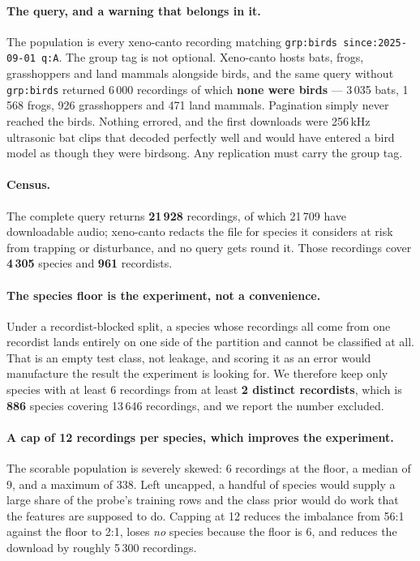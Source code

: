 \documentclass[10pt,twocolumn,a4paper]{article}
\begin{document}
\paragraph{The query, and a warning that belongs in it.} The population is every xeno-canto
recording matching \texttt{grp:birds since:2025-09-01 q:A}. The group tag is not optional.
Xeno-canto hosts bats, frogs, grasshoppers and land mammals alongside birds, and the same
query without \texttt{grp:birds} returned 6\,000 recordings of which \textbf{none were
birds} --- 3\,035 bats, 1\,568 frogs, 926 grasshoppers and 471 land mammals. Pagination
simply never reached the birds. Nothing errored, and the first downloads were 256\,kHz
ultrasonic bat clips that decoded perfectly well and would have entered a bird model as
though they were birdsong. Any replication must carry the group tag.

\paragraph{Census.} The complete query returns \textbf{21\,928} recordings, of which
21\,709 have downloadable audio; xeno-canto redacts the file for species it considers at
risk from trapping or disturbance, and no query gets round it. Those recordings cover
\textbf{4\,305} species and \textbf{961} recordists.

\paragraph{The species floor is the experiment, not a convenience.} Under a
recordist-blocked split, a species whose recordings all come from one recordist lands
entirely on one side of the partition and cannot be classified at all. That is an empty test
class, not leakage, and scoring it as an error would manufacture the result the experiment is
looking for. We therefore keep only species with at least 6 recordings from at least
\textbf{2 distinct recordists}, which is \textbf{886} species covering 13\,646 recordings,
and we report the number excluded.

\paragraph{A cap of 12 recordings per species, which improves the experiment.} The scorable
population is severely skewed: 6 recordings at the floor, a median of 9, and a maximum of
338. Left uncapped, a handful of species would supply a large share of the probe's training
rows and the class prior would do work that the features are supposed to do. Capping at 12
reduces the imbalance from 56:1 against the floor to 2:1, loses \emph{no} species because the
floor is 6, and reduces the download by roughly 5\,300 recordings.
\end{document}
